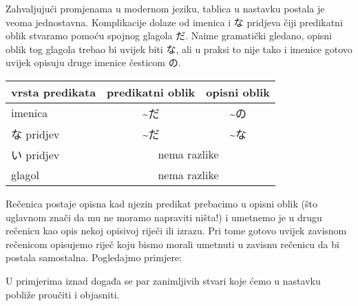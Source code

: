 	
	Zahvaljujući promjenama u modernom jeziku, tablica u nastavku postala je veoma jednostavna. Komplikacije dolaze od imenica i な pridjeva čiji predikatni oblik stvaramo pomoću spojnog glagola だ. Naime gramatički gledano, opisni oblik tog glagola trebao bi uvijek biti な, ali u praksi to nije tako i imenice gotovo uvijek opisuju druge imenice česticom の\footnotemark[4].
	
	
	\begin{table}[h]
		\centering
		\begin{tabular}{l c c}\toprule[2pt]
			vrsta predikata & predikatni oblik & opisni oblik\\
			\midrule
			imenica & \textasciitilde だ & \textasciitilde の\\
			な pridjev & \textasciitilde だ & \textasciitilde な\\
			い pridjev & \multicolumn{2}{c}{nema razlike}\\
			glagol & \multicolumn{2}{c}{nema razlike}\\
			\bottomrule[2pt]
		\end{tabular}
	\end{table}

	
	Rečenica postaje opisna kad njezin predikat prebacimo u opisni oblik (što uglavnom znači da mu ne moramo napraviti ništa!) i umetnemo je u drugu rečenicu kao opis nekoj opisivoj riječi ili izrazu. Pri tome gotovo uvijek zavisnom rečenicom opisujemo riječ koju bismo morali umetnuti u zavisnu rečenicu da bi postala samostalna. Pogledajmo primjere:
	
	\begin{reibun}
	\end{reibun}

	U primjerima iznad događa se par zanimljivih stvari koje ćemo u nastavku pobliže proučiti i objasniti.
	
